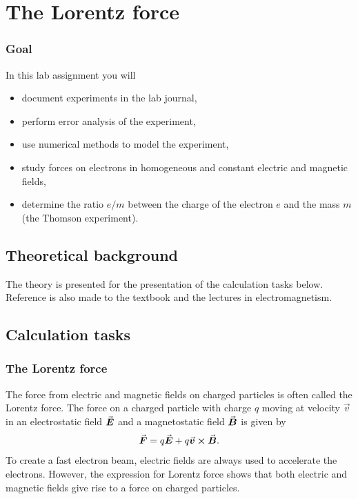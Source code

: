 \documentclass[../Elmag-labhefte-2020.tex]{subfiles}
\begin{document}
\setchapterpreamble[u]{\margintoc}
\chapter{The Lorentz force\label{ch.lorentz}}

\subsection*{Goal}

In this lab assignment you will
%
\begin{itemize}
    \item document experiments in the lab journal,
    \item perform error analysis of the experiment,
    \item use numerical methods to model the experiment,
    \item study forces on electrons in homogeneous and constant electric and magnetic fields,
    \item determine the ratio $e/m$ between the charge of the electron $e$ and the mass $m$ (the Thomson experiment).
\end{itemize}
%

\section{Theoretical background}

The theory is presented for the presentation of the calculation tasks below. Reference is also made to the textbook and the lectures in electromagnetism.

\section{Calculation tasks \label{ch.lorentz.beregn}}

\subsection{The Lorentz force}

The force from electric and magnetic fields on charged particles is often called the Lorentz force. The force on a charged particle with charge $q$ moving at velocity $\vec{v}$ in an electrostatic field $\va*{E}$ and a magnetostatic field $\va*{B}$ is given by
\begin{equation}
    \va*{F} = q \va*{E} + q \va*{v} \cross \va*{B} .
    \label{eq:lorentz.lorentz} %
\end{equation}
%
To create a fast electron beam, electric fields are always used to accelerate the electrons. However, the expression for Lorentz force shows that both electric and magnetic fields give rise to a force on charged particles.
\end{document}
